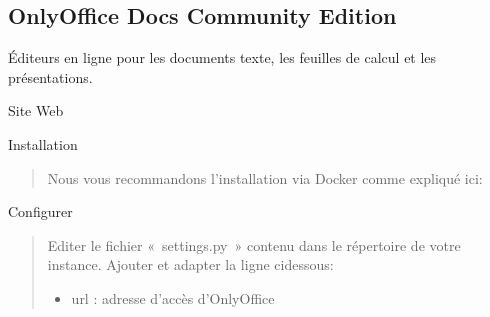 \documentclass[letterpaper,10pt,french]{sphinxmanual}
\begin{document}
\noindent{}


\subsection{OnlyOffice Docs Community Edition}
\label{\detokenize{documents/editor:onlyoffice-docs-community-edition}}
\sphinxAtStartPar
Éditeurs en ligne pour les documents texte, les feuilles de calcul et les présentations.

\sphinxAtStartPar
Site Web
\begin{quote}

\sphinxAtStartPar
{}
\end{quote}

\sphinxAtStartPar
Installation
\begin{quote}

\sphinxAtStartPar
Nous vous recommandons l’installation via Docker comme expliqué ici:
\end{quote}

\sphinxAtStartPar
Configurer
\begin{quote}

\sphinxAtStartPar
Editer le fichier « settings.py » contenu dans le répertoire de votre instance.
Ajouter et adapter la ligne ci\sphinxhyphen{}dessous:
\begin{itemize}
\item {} 
\sphinxAtStartPar
url : adresse d’accès d’OnlyOffice

\end{itemize}
\end{quote}

\begin{sphinxVerbatim}[commandchars=\\\{\}]
   
\end{sphinxVerbatim}
\end{document}
